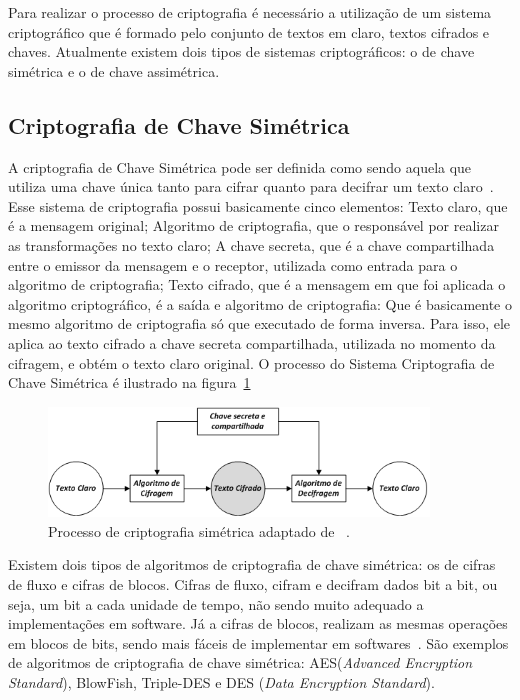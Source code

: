 Para realizar o processo de criptografia é necessário a utilização de um sistema criptográfico que é formado pelo conjunto de textos em claro, textos cifrados e chaves. Atualmente existem dois tipos de sistemas criptográficos: o de chave simétrica e o de chave assimétrica.

\subsection{Criptografia de Chave Simétrica}

A criptografia de Chave Simétrica pode ser definida como sendo aquela que utiliza uma chave única tanto para cifrar quanto para decifrar um texto claro~\cite{stallings2008}. Esse sistema de criptografia possui basicamente cinco elementos: Texto claro, que é a mensagem original; Algoritmo de criptografia, que o responsável por realizar as transformações no texto claro; A chave secreta, que é a chave compartilhada entre o emissor da mensagem e o receptor, utilizada como entrada para o algoritmo de criptografia; Texto cifrado, que é a mensagem em que foi aplicada o algoritmo criptográfico, é a saída e algoritmo de criptografia: Que é basicamente o mesmo algoritmo de criptografia só que executado de forma inversa. Para isso, ele aplica ao texto cifrado a chave secreta compartilhada, utilizada no momento da cifragem, e obtém o texto claro original. O processo do Sistema Criptografia de Chave Simétrica é ilustrado na figura~\ref{fig:criptografiasimetrica}

\begin{figure}[!htb]
\centering
\includegraphics[width=0.9\textwidth]{criptosimetrico1.png}
\caption{Processo de criptografia simétrica adaptado de ~\cite{stallings2008}.}
\label{fig:criptografiasimetrica}
\end{figure}

Existem dois tipos de algoritmos de criptografia de chave simétrica: os de cifras de fluxo e cifras de blocos. Cifras de fluxo, cifram e decifram dados bit a bit, ou seja, um bit a cada unidade de tempo, não sendo muito adequado a implementações em software. Já a cifras de blocos, realizam as mesmas operações em blocos de bits, sendo mais fáceis de implementar em softwares~\cite{Schneier1995}. São exemplos de algoritmos de criptografia de chave simétrica: AES(\emph{Advanced Encryption Standard}), BlowFish, Triple-DES e DES (\emph{Data Encryption Standard}).



